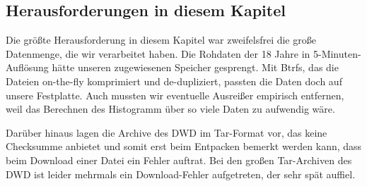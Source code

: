 \subsection{Herausforderungen in diesem Kapitel}
Die größte Herausforderung in diesem Kapitel war zweifelsfrei die große Datenmenge, die wir verarbeitet haben. Die Rohdaten der 18 Jahre in 5-Minuten-Auflösung hätte unseren zugewiesenen Speicher gesprengt. Mit Btrfs, das die Dateien on-the-fly komprimiert und de-dupliziert, passten die Daten doch auf unsere Festplatte. Auch mussten wir eventuelle Ausreißer empirisch entfernen, weil das Berechnen des Histogramm über so viele Daten zu aufwendig wäre.

Darüber hinaus lagen die Archive des DWD im Tar-Format vor, das keine Checksumme anbietet und somit erst beim Entpacken bemerkt werden kann, dass beim Download einer Datei ein Fehler auftrat. Bei den großen Tar-Archiven des DWD ist leider mehrmals ein Download-Fehler aufgetreten, der sehr spät auffiel.
